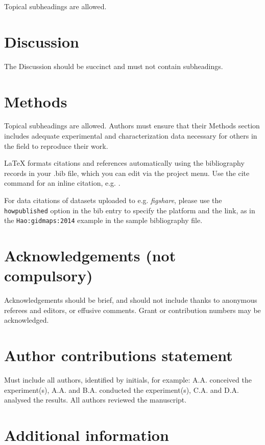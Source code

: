 \documentclass[fleqn,10pt]{wlscirep}
\begin{document}
Topical subheadings are allowed.

\section*{Discussion}

The Discussion should be succinct and must not contain subheadings.

\section*{Methods}

Topical subheadings are allowed. Authors must ensure that their Methods section includes adequate experimental and characterization data necessary for others in the field to reproduce their work.

\nocite{*}


\noindent LaTeX formats citations and references automatically using the bibliography records in your .bib file, which you can edit via the project menu. Use the cite command for an inline citation, e.g.  \cite{Hao:gidmaps:2014}.

For data citations of datasets uploaded to e.g. \emph{figshare}, please use the \verb|howpublished| option in the bib entry to specify the platform and the link, as in the \verb|Hao:gidmaps:2014| example in the sample bibliography file.

\section*{Acknowledgements (not compulsory)}

Acknowledgements should be brief, and should not include thanks to anonymous referees and editors, or effusive comments. Grant or contribution numbers may be acknowledged.

\section*{Author contributions statement}

Must include all authors, identified by initials, for example:
A.A. conceived the experiment(s),  A.A. and B.A. conducted the experiment(s), C.A. and D.A. analysed the results.  All authors reviewed the manuscript. 

\section*{Additional information}
\end{document}
